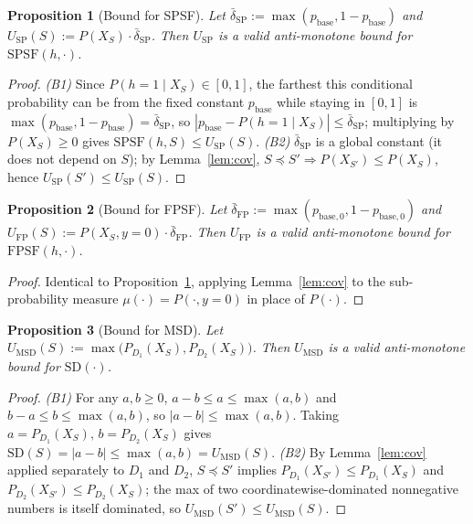 \documentclass[11pt]{article}
\newtheorem{proposition}{Proposition}
\begin{document}
\begin{proposition}[Bound for SPSF]\label{prop:spsf}
Let $\bar\delta_{\mathrm{SP}}:=\max(p_{\mathrm{base}},1-p_{\mathrm{base}})$ and
$U_{\mathrm{SP}}(S):=P(X_S)\cdot\bar\delta_{\mathrm{SP}}$. Then $U_{\mathrm{SP}}$ is a
valid anti-monotone bound for $\mathrm{SPSF}(h,\cdot)$.
\end{proposition}
\begin{proof}
\emph{(B1)} Since $P(h=1\mid X_S)\in[0,1]$, the farthest this conditional probability
can be from the fixed constant $p_{\mathrm{base}}$ while staying in $[0,1]$ is
$\max(p_{\mathrm{base}},1-p_{\mathrm{base}})=\bar\delta_{\mathrm{SP}}$, so
$|p_{\mathrm{base}}-P(h=1\mid X_S)|\le\bar\delta_{\mathrm{SP}}$; multiplying by
$P(X_S)\ge0$ gives $\mathrm{SPSF}(h,S)\le U_{\mathrm{SP}}(S)$.
\emph{(B2)} $\bar\delta_{\mathrm{SP}}$ is a global constant (it does not depend on
$S$); by Lemma~\ref{lem:cov}, $S\preceq S'\Rightarrow P(X_{S'})\le P(X_S)$, hence
$U_{\mathrm{SP}}(S')\le U_{\mathrm{SP}}(S)$.
\end{proof}

\begin{proposition}[Bound for FPSF]\label{prop:fpsf}
Let $\bar\delta_{\mathrm{FP}}:=\max(p_{\mathrm{base},0},1-p_{\mathrm{base},0})$ and
$U_{\mathrm{FP}}(S):=P(X_S,y=0)\cdot\bar\delta_{\mathrm{FP}}$. Then $U_{\mathrm{FP}}$
is a valid anti-monotone bound for $\mathrm{FPSF}(h,\cdot)$.
\end{proposition}
\begin{proof}
Identical to Proposition~\ref{prop:spsf}, applying Lemma~\ref{lem:cov} to the
sub-probability measure $\mu(\cdot)=P(\cdot,y=0)$ in place of $P(\cdot)$.
\end{proof}

\begin{proposition}[Bound for MSD]\label{prop:msd}
Let $U_{\mathrm{MSD}}(S):=\max\bigl(P_{D_1}(X_S),P_{D_2}(X_S)\bigr)$. Then
$U_{\mathrm{MSD}}$ is a valid anti-monotone bound for $\mathrm{SD}(\cdot)$.
\end{proposition}
\begin{proof}
\emph{(B1)} For any $a,b\ge0$, $a-b\le a\le\max(a,b)$ and $b-a\le b\le\max(a,b)$, so
$|a-b|\le\max(a,b)$. Taking $a=P_{D_1}(X_S),\,b=P_{D_2}(X_S)$ gives
$\mathrm{SD}(S)=|a-b|\le\max(a,b)=U_{\mathrm{MSD}}(S)$.
\emph{(B2)} By Lemma~\ref{lem:cov} applied separately to $D_1$ and $D_2$,
$S\preceq S'$ implies $P_{D_1}(X_{S'})\le P_{D_1}(X_S)$ and
$P_{D_2}(X_{S'})\le P_{D_2}(X_S)$; the max of two coordinatewise-dominated
nonnegative numbers is itself dominated, so $U_{\mathrm{MSD}}(S')\le U_{\mathrm{MSD}}(S)$.
\end{proof}
\end{document}
